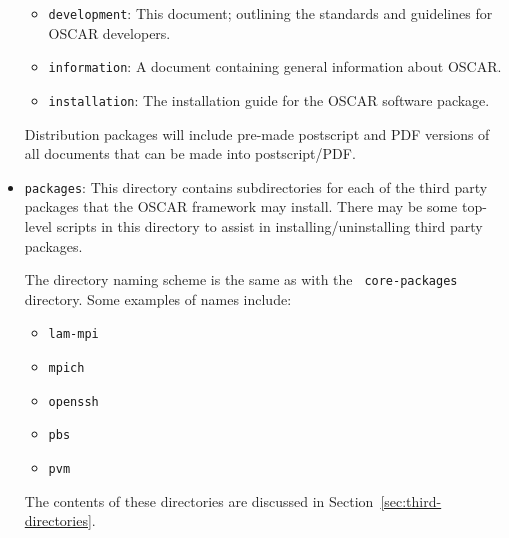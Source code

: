 \begin{itemize}
  \begin{itemize}
  \item {\tt development}: This document; outlining the standards and
    guidelines for OSCAR developers.

  \item {\tt information}: A document containing general information
    about OSCAR.
    
  \item {\tt installation}: The installation guide for the OSCAR
    software package.
  \end{itemize}
  
  Distribution packages will include pre-made postscript and PDF
  versions of all documents that can be made into postscript/PDF.

\item {\tt packages}: This directory contains subdirectories for each
  of the third party packages that the OSCAR framework may install.
  There may be some top-level scripts in this directory to assist in
  installing/uninstalling third party packages.

  The directory naming scheme is the same as with the {\tt
    core-packages} directory.  Some examples of names include:

  \begin{itemize}
  \item {\tt lam-mpi}
  \item {\tt mpich}
  \item {\tt openssh}
  \item {\tt pbs}
  \item {\tt pvm}
  \end{itemize}
  
  The contents of these directories are discussed in
  Section~\ref{sec:third-directories}.

\end{itemize}

